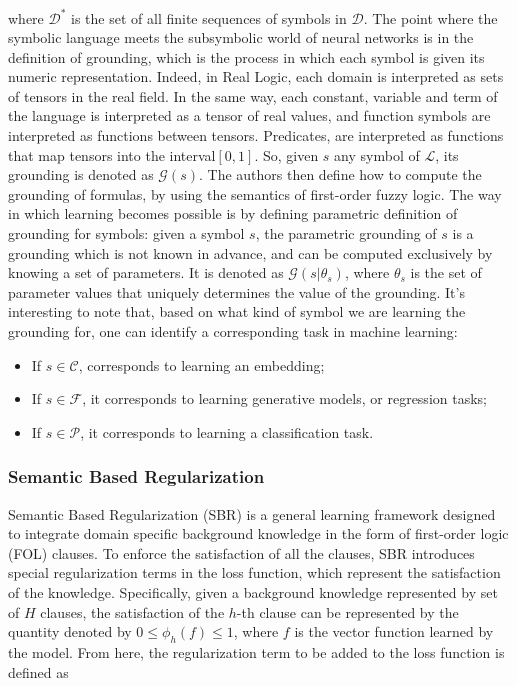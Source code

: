 where $\mathcal{D^*}$ is the set of all finite sequences of symbols in $\mathcal{D}$.
The point where the symbolic language meets the subsymbolic world of neural networks is in the definition of grounding, which is the process in which each symbol is given its numeric representation. Indeed, in Real Logic, each domain is interpreted as sets of tensors in the real field. In the same way, each constant, variable and term of the language is interpreted as a tensor of real values, and function symbols are interpreted as functions between tensors. Predicates, are interpreted as functions that map tensors into the interval$[0,1]$. So, given $s$ any symbol of $\mathcal{L}$, its grounding is denoted as $\mathcal{G}(s)$. 
The authors then define how to compute the grounding of formulas, by using the semantics of first-order fuzzy logic. 
The way in which learning becomes possible is by defining parametric definition of grounding for symbols: given a symbol $s$, the parametric grounding of $s$ is a grounding which is not known in advance, and can be computed exclusively by knowing a set of parameters. It is denoted as $\mathcal{G}(s|\theta_s)$, where $\theta_s$ is the set of parameter values that uniquely determines the value of the grounding. It's interesting to note that, based on what kind of symbol we are learning the grounding for, one can identify a corresponding task in machine learning:
\begin{itemize}
	\item If $s \in \mathcal{C}$, corresponds to learning an embedding;
	\item If $s \in \mathcal{F}$, it corresponds to learning generative models, or regression tasks;
	\item If $s \in \mathcal{P}$, it corresponds to learning a classification task.
\end{itemize}

\subsubsection{Semantic Based Regularization}
Semantic Based Regularization (SBR) is a general learning framework designed to integrate domain specific background knowledge in the form of first-order logic (FOL) clauses. To enforce the satisfaction of all the clauses, SBR introduces special regularization terms in the loss function, which represent the satisfaction of the knowledge. Specifically, given a background knowledge represented by set of $H$ clauses, the satisfaction of the $h$-th clause can be represented by the quantity denoted by $0 \leq \phi_h(f) \leq 1$, where $f$ is the vector function learned by the model. From here, the regularization term to be added to the loss function is defined as

